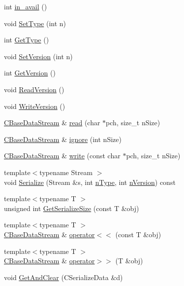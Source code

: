 \begin{DoxyCompactItemize}
int \mbox{\hyperlink{class_c_base_data_stream_af7c7582f5f38997b0f22b2c44c391f11}{in\+\_\+avail}} ()
\item 
void \mbox{\hyperlink{class_c_base_data_stream_a02c042f25f960b7c974db3c30ee056a5}{Set\+Type}} (int n)
\item 
int \mbox{\hyperlink{class_c_base_data_stream_a758ee870d0c9bf3bb347b584cd02c53f}{Get\+Type}} ()
\item 
void \mbox{\hyperlink{class_c_base_data_stream_a536e45089156e085c0759aaf27aa7c4c}{Set\+Version}} (int n)
\item 
int \mbox{\hyperlink{class_c_base_data_stream_a75a64b190fc029cb1938c6d832748057}{Get\+Version}} ()
\item 
void \mbox{\hyperlink{class_c_base_data_stream_ada664c82a99a1147deeb084df1dab41c}{Read\+Version}} ()
\item 
void \mbox{\hyperlink{class_c_base_data_stream_a5ecdb53462dbc5dbf976b12482852223}{Write\+Version}} ()
\item 
\mbox{\hyperlink{class_c_base_data_stream}{C\+Base\+Data\+Stream}} \& \mbox{\hyperlink{class_c_base_data_stream_a46f9e59af924d509662166af4d232320}{read}} (char $\ast$pch, size\+\_\+t n\+Size)
\item 
\mbox{\hyperlink{class_c_base_data_stream}{C\+Base\+Data\+Stream}} \& \mbox{\hyperlink{class_c_base_data_stream_aa16c563ce4b72146ac67ea6a3278bc3f}{ignore}} (int n\+Size)
\item 
\mbox{\hyperlink{class_c_base_data_stream}{C\+Base\+Data\+Stream}} \& \mbox{\hyperlink{class_c_base_data_stream_a82d8850aa10720a065628ca72d12801b}{write}} (const char $\ast$pch, size\+\_\+t n\+Size)
\item 
{\footnotesize template$<$typename Stream $>$ }\\void \mbox{\hyperlink{class_c_base_data_stream_af83455eaa7f251031dd20f7075637701}{Serialize}} (Stream \&s, int \mbox{\hyperlink{class_c_base_data_stream_acd93d8bc03d65130819f2ff79be43234}{n\+Type}}, int \mbox{\hyperlink{class_c_base_data_stream_a9a6ab5bb4c659f3ee03dca351c9de88e}{n\+Version}}) const
\item 
{\footnotesize template$<$typename T $>$ }\\unsigned int \mbox{\hyperlink{class_c_base_data_stream_aeb38b7dcee457f0d0c5679cf88724c9f}{Get\+Serialize\+Size}} (const T \&obj)
\item 
{\footnotesize template$<$typename T $>$ }\\\mbox{\hyperlink{class_c_base_data_stream}{C\+Base\+Data\+Stream}} \& \mbox{\hyperlink{class_c_base_data_stream_a453748ece985685b2d561fcf2028cff8}{operator$<$$<$}} (const T \&obj)
\item 
{\footnotesize template$<$typename T $>$ }\\\mbox{\hyperlink{class_c_base_data_stream}{C\+Base\+Data\+Stream}} \& \mbox{\hyperlink{class_c_base_data_stream_aa2733313d5d254eaa7950a480dd6b280}{operator$>$$>$}} (T \&obj)
\item 
void \mbox{\hyperlink{class_c_base_data_stream_aaec8aaffcfceb2d4c5f04558c5034ed9}{Get\+And\+Clear}} (C\+Serialize\+Data \&d)
\end{DoxyCompactItemize}

